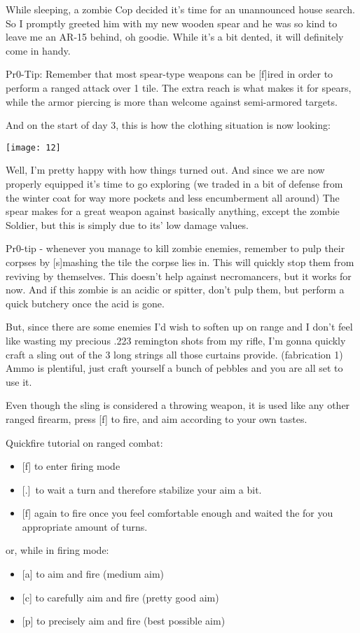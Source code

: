 While sleeping, a zombie Cop decided it's time for an unannounced house search. So I promptly greeted him with my new wooden spear and he was so kind to leave me an AR-15 behind, oh goodie. While it's a bit dented, it will definitely come in handy.

Pr0-Tip: Remember that most spear-type weapons can be [f]ired in order to perform a ranged attack over 1 tile. The extra reach is what makes it for spears, while the armor piercing is more than welcome against semi-armored targets.

And on the start of day 3, this is how the clothing situation is now looking:

\begin{center}
\texttt{[image: 12]}
\end{center}

Well, I'm pretty happy with how things turned out. And since we are now properly equipped it's time to go exploring (we traded in a bit of defense from the winter coat for way more pockets and less encumberment all around) The spear makes for a great weapon against basically anything, except the zombie Soldier, but this is simply due to its' low damage values.

Pr0-tip - whenever you manage to kill zombie enemies, remember to pulp their corpses by [s]mashing the tile the corpse lies in. This will quickly stop them from reviving by themselves. This doesn't help against necromancers, but it works for now. And if this zombie is an acidic or spitter, don't pulp them, but perform a quick butchery once the acid is gone.

But, since there are some enemies I'd wish to soften up on range and I don't feel like wasting my precious .223 remington shots from my rifle, I'm gonna quickly craft a sling out of the 3 long strings all those curtains provide. (fabrication 1) Ammo is plentiful, just craft yourself a bunch of pebbles and you are all set to use it.

Even though the sling is considered a throwing weapon, it is used like any other ranged firearm, press [f] to fire, and aim according to your own tastes.

Quickfire tutorial on ranged combat:
\begin{itemize}
\item{} [f] to enter firing mode
\item{} [.]~to wait a turn and therefore stabilize your aim a bit.
\item{} [f] again to fire once you feel comfortable enough and waited the for you appropriate amount of turns.
\end{itemize}
or, while in firing mode:
\begin{itemize}
\item{} [a] to aim and fire (medium aim)
\item{} [c] to carefully aim and fire (pretty good aim)
\item{} [p] to precisely aim and fire (best possible aim)
\end{itemize}

